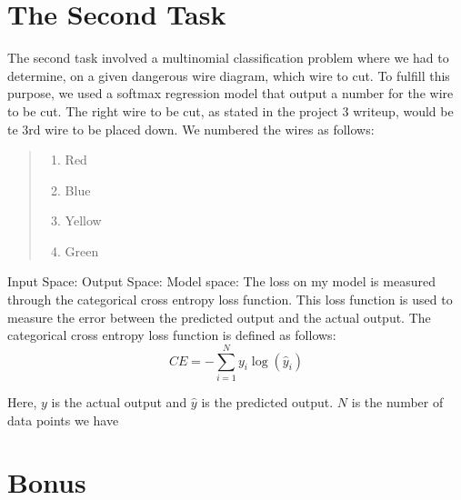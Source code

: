 \documentclass{article}
\begin{document}
\section*{The Second Task}
The second task involved a multinomial classification problem where we had to determine, on a given dangerous wire diagram, which wire to cut.
To fulfill this purpose, we used a softmax regression model that output a number for the wire to be cut. The right wire to be cut, as stated in the project 3 writeup, would be te 3rd wire to be placed down.\newline
\newline
We numbered the wires as follows:
\begin{quote}
    \begin{enumerate}
    \item Red
    \item Blue
    \item Yellow
    \item Green
    \end{enumerate}
\end{quote}

\noindent Input Space:\newline
Output Space:\newline
Model space:\newline
\newline The loss on my model is measured through the categorical cross entropy loss function. 
This loss function is used to measure the error between the predicted output and the actual output. The categorical cross entropy loss function is defined as follows:
\begin{equation}
    CE = -\sum_{i=1}^{N} y_{i} \log(\hat{y}_{i})
\end{equation}

\noindent Here, $y$ is the actual output and $\hat{y}$ is the predicted output. $N$ is the number of data points we have
\section*{Bonus}
\end{document}
